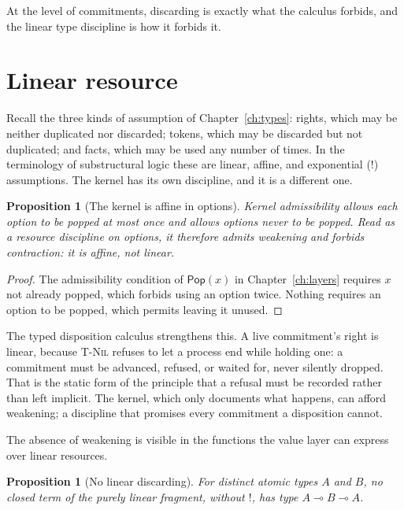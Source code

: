 \documentclass[11pt,openany]{book}
\newtheorem{proposition}[theorem]{Proposition}
\theoremstyle{remark}
\newcommand{\Pop}{\mathsf{Pop}}
\begin{document}
At the level of commitments, discarding is exactly what the calculus
forbids, and the linear type discipline is how it forbids it.

\section{Linear resource}

Recall the three kinds of assumption of Chapter~\ref{ch:types}: rights,
which may be neither duplicated nor discarded; tokens, which may be
discarded but not duplicated; and facts, which may be used any number of
times. In the terminology of substructural logic these are linear,
affine, and exponential ($!$) assumptions. The kernel has its own
discipline, and it is a different one.

\begin{proposition}[The kernel is affine in options]\label{prop:affine}
Kernel admissibility allows each option to be popped at most once and
allows options never to be popped. Read as a resource discipline on
options, it therefore admits weakening and forbids contraction: it is
affine, not linear.
\end{proposition}

\begin{proof}
The admissibility condition of $\Pop(x)$ in Chapter~\ref{ch:layers}
requires $x$ not already popped, which forbids using an option twice.
Nothing requires an option to be popped, which permits leaving it unused.
\end{proof}

The typed disposition calculus strengthens this. A live commitment's right
is linear, because \textsc{T-Nil} refuses to let a process end while
holding one: a commitment must be advanced, refused, or waited for, never
silently dropped. That is the static form of the principle that a refusal
must be recorded rather than left implicit. The kernel, which only
documents what happens, can afford weakening; a discipline that promises
every commitment a disposition cannot.

The absence of weakening is visible in the functions the value layer can
express over linear resources.

\begin{proposition}[No linear discarding]\label{prop:nok}
For distinct atomic types $A$ and $B$, no closed term of the purely
linear fragment, without $!$, has type $A\multimap B\multimap A$.
\end{proposition}
\end{document}
